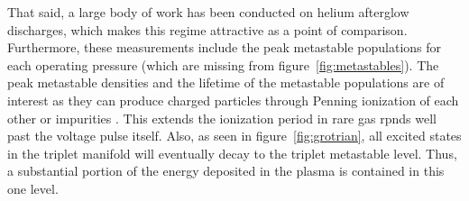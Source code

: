 That said, a large body of work has been conducted on helium afterglow
discharges, which makes this regime attractive as a point of comparison.
Furthermore, these measurements include the peak metastable populations for each
operating pressure (which are missing from figure~\ref{fig:metastables}). The
peak metastable densities and the lifetime of the metastable populations are of
interest as they can produce charged particles through Penning ionization of
each other or impurities \cite{Nersisyan2004}. This extends the ionization
period in rare gas \acs{rpnd}s well past the voltage pulse itself. Also, as seen
in figure~\ref{fig:grotrian}, all excited states in the triplet manifold will
eventually decay to the triplet metastable level. Thus, a substantial portion of
the energy deposited in the plasma is contained in this one level.

